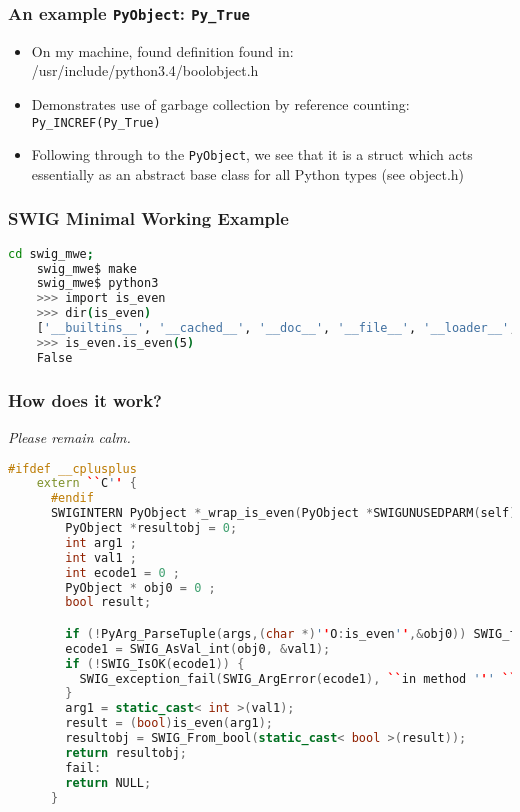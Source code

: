 \documentclass{beamer}
\begin{document}
\begin{frame}[fragile]
  \frametitle{An example \texttt{PyObject}: \texttt{Py\_True}}
  \begin{itemize}
  \item On my machine, found definition found in: /usr/include/python3.4/boolobject.h
  \item Demonstrates use of garbage collection by reference counting: \texttt{Py\_INCREF(Py\_True)}
  \item Following through to the \texttt{PyObject}, we see that it is a struct which acts essentially as an abstract base class for all Python types (see object.h)
  \end{itemize}
    
\end{frame}

\begin{frame}[fragile]
  \frametitle{SWIG Minimal Working Example}
  \begin{lstlisting}[language=bash]
    cd swig_mwe;
    swig_mwe$ make
    swig_mwe$ python3
    >>> import is_even
    >>> dir(is_even)
    ['__builtins__', '__cached__', '__doc__', '__file__', '__loader__', '__name__', '__package__', '__spec__', '_is_even', '_newclass', '_object', '_swig_getattr', '_swig_getattr_nondynamic', '_swig_property', '_swig_repr', '_swig_setattr', '_swig_setattr_nondynamic', 'is_even']
    >>> is_even.is_even(5)
    False
  \end{lstlisting}
\end{frame}

\begin{frame}[fragile]
  \frametitle{How does it work?}
  \emph{Please remain calm.}
  \begin{lstlisting}[language=c++]
    #ifdef __cplusplus
    extern ``C'' {
      #endif
      SWIGINTERN PyObject *_wrap_is_even(PyObject *SWIGUNUSEDPARM(self), PyObject *args) {
        PyObject *resultobj = 0;
        int arg1 ;
        int val1 ;
        int ecode1 = 0 ;
        PyObject * obj0 = 0 ;
        bool result;

        if (!PyArg_ParseTuple(args,(char *)''O:is_even'',&obj0)) SWIG_fail;
        ecode1 = SWIG_AsVal_int(obj0, &val1);
        if (!SWIG_IsOK(ecode1)) {
          SWIG_exception_fail(SWIG_ArgError(ecode1), ``in method ''' ``is_even'' ``', argument `` ``1" of type ''' ``int"''');
        }
        arg1 = static_cast< int >(val1);
        result = (bool)is_even(arg1);
        resultobj = SWIG_From_bool(static_cast< bool >(result));
        return resultobj;
        fail:
        return NULL;
      }
    \end{lstlisting}  
\end{frame}
\end{document}
